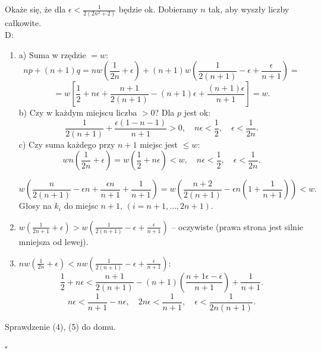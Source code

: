 \documentclass[12pt,a4paper]{article}
\theoremstyle{break}
\begin{document}
	
	Okaże się, że dla $\epsilon < \frac{1}{2(2n^2+2)}$ będzie ok. Dobieramy $n$ tak, aby wyszły liczby całkowite.\\
	
	D:
	
	\begin{enumerate}[1)]
		\item  a) Suma w rzędzie $= w$:
		\[
		np + (n+1)q = nw\left(\frac{1}{2n}+\epsilon\right) + (n+1)w\left(\frac{1}{2(n+1)}-\epsilon + \frac{\epsilon}{n+1}\right) =\]\[ =w\left[\frac{1}{2} + n\epsilon + \frac{n+1}{2(n+1)} - (n+1)\epsilon + \frac{(n+1)\epsilon}{n+1}\right] = w.
		\]
		b) Czy w każdym miejscu liczba $> 0$? Dla $p$ jest ok:
		\[
		\frac{1}{2(n+1)} + \frac{\epsilon(1-n-1)}{n+1} > 0, \quad n\epsilon < \frac{1}{2}, \quad \epsilon < \frac{1}{2n}.
		\]
		c) Czy suma każdego przy $n+1$ miejsc jest $\leq w$:
		\[
		wn\left(\frac{1}{2n}+\epsilon\right) = w\left(\frac{1}{2} + n\epsilon\right) < w, \quad n\epsilon < \frac{1}{2}, \quad \epsilon < \frac{1}{2n}.
		\]
		
		\[
		w\left(\frac{n}{2(n+1)}-\epsilon n + \frac{\epsilon n}{n+1}+\frac{1}{n+1}\right) = w\left(\frac{n+2}{2(n+1)}-\epsilon n\left(1+\frac{1}{n+1}\right)\right) < w.
		\]
		Głosy na $k_i$ do miejsc $n+1$, $(i=n+1, \dots, 2n+1)$.
		
		\item  $w\left(\frac{1}{2n+1}+\epsilon\right) > w\left(\frac{1}{2(n+1)}-\epsilon + \frac{\epsilon}{n+1}\right)$ -- oczywiste (prawa strona jest silnie mniejsza od lewej).
		
		\item  $nw\left(\frac{1}{2n}+\epsilon\right) < nw\left(\frac{1}{2(n+1)} -\epsilon + \frac{\epsilon}{n+1}\right)$:
		\[
		\frac{1}{2} + n\epsilon < \frac{n+1}{2(n+1)} - (n+1)\left(\frac{n+1\epsilon - \epsilon}{n+1}\right) + \frac{1}{n+1}.
		\]
		\[
		n\epsilon < \frac{1}{n+1} - n\epsilon, \quad 2n\epsilon < \frac{1}{n+1}, \quad \epsilon < \frac{1}{2n(n+1)}.
		\]
	\end{enumerate}
	
	Sprawdzenie (4), (5) do domu.
	
	\begin{flushright}
		$\square$
	\end{flushright}
	
\end{document}
